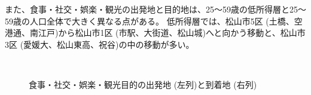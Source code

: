 \documentclass[a4paper,12pt, uplatex]{jsbook}
\begin{document}
また、食事・社交・娯楽・観光の出発地と目的地は、25〜59歳の低所得層と25〜59歳の人口全体で大きく異なる点がある。
低所得層では、松山市5区 (土橋、空港通、南江戸)から松山市1区 (市駅、大街道、松山城)へと向かう移動と、松山市3区 (愛媛大、松山東高、祝谷)の中の移動が多い。
%
\begin{figure}[htbp]
  \centering
  \\%
    \caption{食事・社交・娯楽・観光目的の出発地 (左列)と到着地 (右列)}
  	\label{fig:od_leisure_income}
\end{figure}
\end{document}
